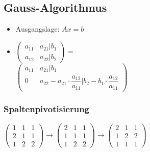 \documentclass[6pt,a4paper]{scrartcl}
\begin{document}
\begin{multicols*}{4}
		\subsection{Gauss-Algorithmus}
			\begin{itemize}\itemsep0pt		
				\item Ausgangslage: $Ax = b$
				\item $\begin{pmatrix}a_{11}&a_{21} | b_{1}\\a_{12}&a_{22}|b_{2}\end{pmatrix} = $ \\ $\begin{pmatrix}a_{11}&a_{21} | b_{1}\\0&a_{22}-a_{21}\cdot \dfrac{a_{12}}{a_{11}}|b_{2}-b_{1}\cdot \dfrac{a_{12}}{a_{11}}\end{pmatrix} $
			\end{itemize}
			\subsubsection{Spaltenpivotisierung}
			$\begin{pmatrix}1&1&1\\2&1&1\\1&2&2\end{pmatrix} \rightarrow \begin{pmatrix}2&1&1\\1&1&1\\1&2&2\end{pmatrix} \rightarrow \begin{pmatrix}2&1&1\\1&2&2\\1&1&1\end{pmatrix}$
	

\end{multicols*}
\end{document}
